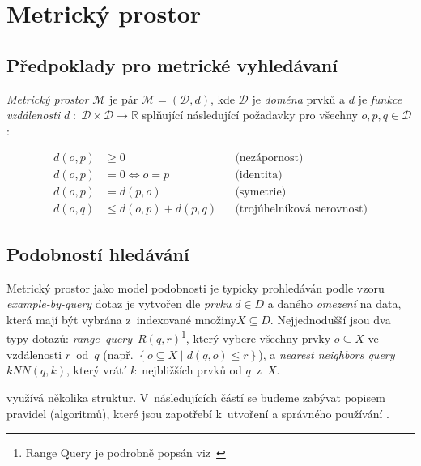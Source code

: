 \section{Metrický prostor}

\subsection{Předpoklady pro metrické vyhledávaní}

\emph{Metrický prostor }$\mathcal{M}$ je pár $\mathcal{M}=(\mathcal{D},d)$,
kde $\mathcal{D}$ je \emph{doména} prvků a $d$ je \emph{funkce vzdálenosti}
$d\;:\;\mathcal{D}\times\mathcal{D}\rightarrow\mathbb{R}$ splňující
následující požadavky pro všechny $o,p,q\in\mathcal{D}$:

\begin{align*}
d(o,p) & \geq0 &  & \textrm{(nezápornost)}\\
d(o,p) & =0\Longleftrightarrow o=p &  & \textrm{(identita)}\\
d(o,p) & =d(p,o) &  & \textrm{(symetrie)}\\
d(o,q) & \leq d(o,p)+d(p,q) &  & \textrm{(trojúhelníková nerovnost)}
\end{align*}

\subsection{Podobností hledávání}

Metrický prostor jako model podobnosti je typicky prohledáván podle
vzoru \emph{example-by-query} \textendash{} dotaz je vytvořen dle
\emph{prvku} $d\in D$ a daného \emph{omezení} na data, která mají
být vybrána z~indexované množiny$X\subseteq D$\@. Nejjednodušší
jsou dva typy dotazů: \emph{range~query}~$R(q,r)$\footnote{Range Query je podrobně popsán viz~
}, který vybere všechny prvky $o\subseteq X$ ve vzdálenosti $r$~od~$q$
(např. $\left\{ o\subseteq X\mid d(q,o)\leq r\right\} $), a \emph{nearest
neighbors query} $kNN(q,k)$, který vrátí $k$~nejbližších prvků
od $q$~z~$X$\@.

\MIndex{} využívá několika struktur\@. V~následujících částí se budeme
zabývat popisem pravidel (algoritmů), které jsou zapotřebí k~utvoření
a správného používání .